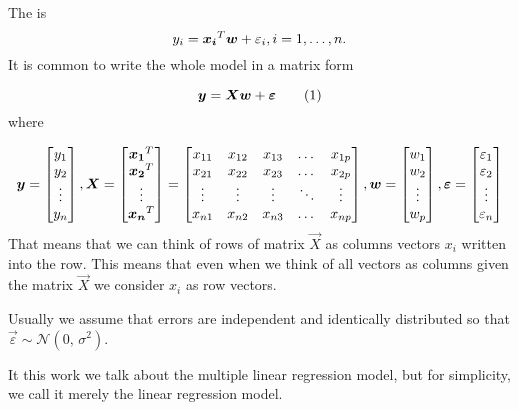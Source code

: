 \begin{definition}\label{definition:lr_model_multiple}
The  is 
\begin{equation}
        y_i = \vec{x_i}^T\vec{w} + \varepsilon_i,\\ i=1,\ldots , n.
\end{equation}
It is common to write the whole model in a matrix form

\begin{equation}
    \vec{y} = \vec{X}\vec{w} + \vec{\varepsilon}    \numberthis
\end{equation} where

\[ 
\vec{y} = \begin{bmatrix}
    y_{1} \\
    y_{2} \\
    \vdots \\
    y_{n}
  \end{bmatrix}\\,
 \vec{X} = \begin{bmatrix}
    \vec{x_1}^T \\
    \vec{x_2}^T \\
    \vdots \\
    \vec{x_n}^T
\end{bmatrix}
=
\begin{bmatrix}
    x_{11} & x_{12} & x_{13} & \dots  & x_{1p} \\
    x_{21} & x_{22} & x_{23} & \dots  & x_{2p} \\
    \vdots & \vdots & \vdots & \ddots & \vdots \\
    x_{n1} & x_{n2} & x_{n3} & \dots  & x_{np}
\end{bmatrix}\\,
\vec{w} = \begin{bmatrix}
    w_{1} \\
    w_{2} \\
    \vdots \\
    w_{p}
  \end{bmatrix}\\,
  \vec{\varepsilon} = \begin{bmatrix}
    \varepsilon_{1} \\
    \varepsilon_{2} \\
    \vdots \\
    \varepsilon_{n}
  \end{bmatrix}
\]
That means that we can think of rows of matrix $\vec{X}$ as columns vectors $x_i$ written into the row. This means that even when we think of all vectors as columns given the matrix $\vec{X}$ we consider $x_i$ as row vectors. 

Usually we assume that errors are independent and identically distributed so that $\vec{\varepsilon} \sim \mathcal{N}(0,\,\sigma^{2})$.
\end{definition}
It this work we talk about the multiple linear regression model, but for simplicity, we call it merely the linear regression model.

